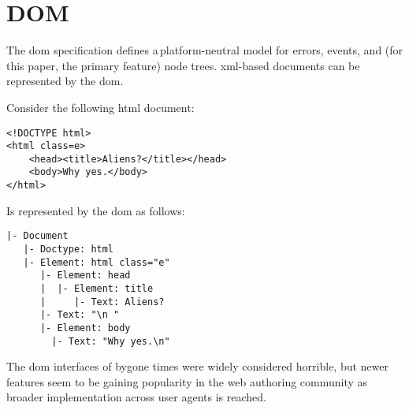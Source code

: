 
\chapter{DOM}\label{appendix-dom}

The \gls{dom} specification defines a\,platform-neutral model for errors,
  events, and (for this paper, the primary feature) node trees.
\acrshort{xml}-based documents can be represented by the \gls{dom}.

Consider the following \gls{html} document:

\begin{lstlisting}
<!DOCTYPE html>
<html class=e>
    <head><title>Aliens?</title></head>
    <body>Why yes.</body>
</html>
\end{lstlisting}

\noindent Is represented by the \gls{dom} as follows:

\begin{lstlisting}
|- Document
   |- Doctype: html
   |- Element: html class="e"
      |- Element: head
      |  |- Element: title
      |     |- Text: Aliens?
      |- Text: "\n "
      |- Element: body
        |- Text: "Why yes.\n"
\end{lstlisting}

\noindent The \gls{dom} interfaces of bygone times were widely considered
  horrible, but newer features seem to be gaining popularity in the web
  authoring community as broader implementation across user agents is reached.
